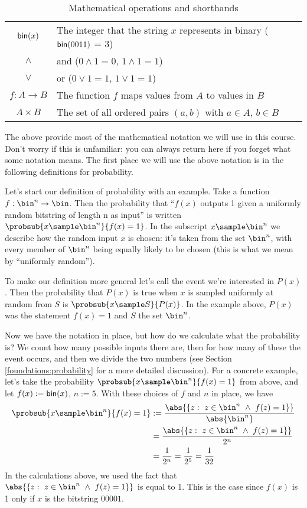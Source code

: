 \begin{table}
\begin{tabular}{c | l}
    $\textsf{bin}(x)$     & The integer that the string $x$ represents in binary ($\textsf{bin}(0011)$ = 3)             \\
    $\wedge$         & and ($0 \wedge 1 = 0$, $1 \wedge 1 = 1$)                                               \\
    $\vee$           & or ($0 \vee 1 = 1$, $1 \vee 1 = 1$)                                                    \\
    $f: A \to B$     & The function $f$ maps values from $A$ to values in $B$                                 \\
    $A \times B$     & The set of all ordered pairs $(a,b)$ with $a \in A$, $b \in B$                         \\
  \end{tabular}
  \caption{Mathematical operations and shorthands}\label{table:math}
\end{table}

The above provide most of the mathematical notation we will use in this course. Don't worry if this is unfamiliar: you can always return here if you forget what some notation means. The first place we will use the above notation is in the following definitions for probability.

Let's start our definition of probability with an example. Take a function $f: \bin^n \rightarrow \bin$. Then the probability that ``$f(x)$ outputs 1 given a uniformly random bitstring of length n as input'' is written \(\probsub{x \sample \bin^n}{f(x) = 1}\). In the subscript $x \sample \bin^n$ we describe how the random input $x$ is chosen: it's taken from the set $\bin^n$, with every member of $\bin^n$ being equally likely to be chosen (this is what we mean by ``uniformly random'').

To make our definition more general let's call the event we're interested in $P(x)$. Then the probability that $P(x)$ is true when $x$ is sampled uniformly at random from $S$ is \(\probsub{x \sample S}{P(x)}\). In the example above, $P(x)$ was the statement $f(x) = 1$ and $S$ the set $\bin^n$.

Now we have the notation in place, but how do we calculate what the probability is? We count how many possible inputs there are, then for how many of these the event occurs, and then we divide the two numbers (see Section \ref{foundations:probability} for a more detailed discussion). For a concrete example, let's take the probability \(\probsub{x \sample \bin^n}{f(x) = 1}\) from above, and let $f(x) := \textsf{bin}(x)$, $n := 5$. With these choices of $f$ and $n$ in place, we have
\begin{align*}
  \probsub{x\sample \bin^n}{f(x)=1} & :=\frac{\abs{\{z:\  z\in\bin^n\ \wedge \ f(z)=1\}}}{\abs{\bin^n}} \\
                                    & =\frac{\abs{\{z:\  z\in\bin^n\ \wedge \ f(z)=1\}}}{2^n}           \\
                                    & =\frac{1}{2^n} = \frac{1}{2^5} = \frac{1}{32}
\end{align*}
In the calculations above, we used the fact that $\abs{\{z:\  z\in\bin^n\ \wedge \ f(z)=1\}}$ is equal to 1. This is the case since $f(x)$ is 1 only if $x$ is the bitstring $00001$.